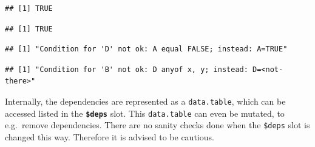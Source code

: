 \documentclass[]{scrbook}
\newenvironment{Shaded}{\begin{snugshade}}{\end{snugshade}}
\newcommand{\CommentTok}[1]{\textcolor[rgb]{0.56,0.35,0.01}{\textit{#1}}}
\newcommand{\DataTypeTok}[1]{\textcolor[rgb]{0.13,0.29,0.53}{#1}}
\newcommand{\DecValTok}[1]{\textcolor[rgb]{0.00,0.00,0.81}{#1}}
\newcommand{\KeywordTok}[1]{\textcolor[rgb]{0.13,0.29,0.53}{\textbf{#1}}}
\newcommand{\NormalTok}[1]{#1}
\newcommand{\OperatorTok}[1]{\textcolor[rgb]{0.81,0.36,0.00}{\textbf{#1}}}
\newcommand{\OtherTok}[1]{\textcolor[rgb]{0.56,0.35,0.01}{#1}}
\newcommand{\StringTok}[1]{\textcolor[rgb]{0.31,0.60,0.02}{#1}}
\renewenvironment{Shaded} {\begin{snugshade}\small} {\end{snugshade}}
\begin{document}
\begin{verbatim}
## [1] TRUE
\end{verbatim}

\begin{Shaded}
\end{Shaded}

\begin{verbatim}
## [1] TRUE
\end{verbatim}

\begin{Shaded}
\end{Shaded}

\begin{verbatim}
## [1] "Condition for 'D' not ok: A equal FALSE; instead: A=TRUE"
\end{verbatim}

\begin{Shaded}
\end{Shaded}

\begin{verbatim}
## [1] "Condition for 'B' not ok: D anyof x, y; instead: D=<not-there>"
\end{verbatim}

Internally, the dependencies are represented as a \texttt{data.table}, which can be accessed listed in the \textbf{\texttt{\$deps}} slot.
This \texttt{data.table} can even be mutated, to e.g.~remove dependencies.
There are no sanity checks done when the \texttt{\$deps} slot is changed this way.
Therefore it is advised to be cautious.
\end{document}
